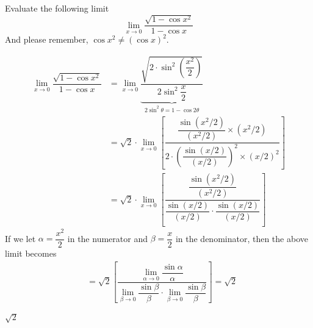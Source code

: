 



\question[5] Evaluate the following limit \[ \lim_{x\to 0}\dfrac{\sqrt{1-\cos x^2}}{1-\cos x}\]
And please remember, $\cos x^2\neq (\cos x)^2$.

\begin{solution}[\halfpage]
  \begin{align}
    \lim_{x\to 0}\dfrac{\sqrt{1-\cos x^2}}{1-\cos x} &=
    \lim_{x\to 0}\underbrace{\dfrac{\sqrt{2\cdot\sin^2\left(\dfrac{x^2}{2}\right)}}{2\sin^2\dfrac{x}{2}}}_{2\sin^2\theta = 1-\cos 2\theta} \\
    &= \sqrt{2}\cdot\lim_{x\to 0}\left[\dfrac
    {\dfrac{\sin (x^2/2)}{(x^2/2)}\times (x^2/2)}
    {2\cdot\left(\dfrac{\sin (x/2)}{(x/2)}\right)^2
    \times\left( x/2 \right)^2}\right] \\
    &= \sqrt{2}\cdot\lim_{x\to 0}\left[\dfrac
    {\dfrac{\sin (x^2/2)}{(x^2/2)}}
    {\dfrac{\sin (x/2)}{(x/2)}\cdot\dfrac{\sin (x/2)}{(x/2)}}\right]
  \end{align}
  If we let $\alpha = \dfrac{x^2}{2}$ in the numerator and $\beta = \dfrac{x}{2}$
  in the denominator, then the above limit becomes 
  \begin{align}
    &= \sqrt{2}\left[\dfrac{\lim_{\alpha\to 0}\dfrac{\sin\alpha}{\alpha}}
    {\lim_{\beta\to 0}\dfrac{\sin\beta}{\beta}\cdot\lim_{\beta\to 0}\dfrac{\sin\beta}{\beta}}\right] = \sqrt{2}
  \end{align}
\end{solution}

\ifprintanswers\begin{codex}$\sqrt{2}$\end{codex}\fi
